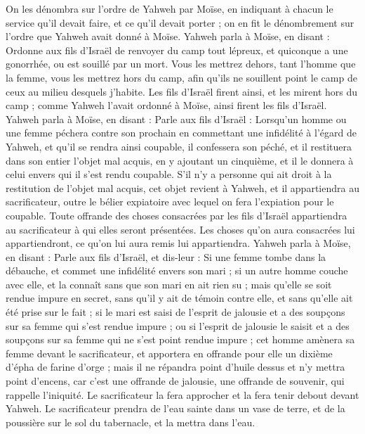 \begin{multicols}{2}
On les dénombra sur l’ordre de Yahweh par Moïse, en indiquant à chacun le service qu’il devait faire, et ce qu'il devait porter ; on en fit le dénombrement sur l’ordre que Yahweh avait donné à Moïse.
\VerseOne{}Yahweh parla à Moïse, en disant :
Ordonne aux fils d'Israël de renvoyer du camp tout lépreux, et quiconque a une gonorrhée, ou est souillé par un mort.
Vous les mettrez dehors, tant l'homme que la femme, vous les mettrez hors du camp, afin qu'ils ne souillent point le camp de ceux au milieu desquels j'habite.
Les fils d'Israël firent ainsi, et les mirent hors du camp ; comme Yahweh l’avait ordonné à Moïse, ainsi firent les fils d'Israël.
Yahweh parla à Moïse, en disant :
Parle aux fils d'Israël : Lorsqu’un homme ou une femme péchera contre son prochain en commettant une infidélité à l’égard de Yahweh, et qu’il se rendra ainsi coupable,
il confessera son péché, et il restituera dans son entier l’objet mal acquis, en y ajoutant un cinquième, et il le donnera à celui envers qui il s’est rendu coupable.
S’il n’y a personne qui ait droit à la restitution de l’objet mal acquis, cet objet revient à Yahweh, et il appartiendra au sacrificateur, outre le bélier expiatoire avec lequel on fera l’expiation pour le coupable.
Toute offrande des choses consacrées par les fils d'Israël appartiendra au sacrificateur à qui elles seront présentées.
Les choses qu’on aura consacrées lui appartiendront, ce qu’on lui aura remis lui appartiendra.
Yahweh parla à Moïse, en disant :
Parle aux fils d'Israël, et dis-leur : Si une femme tombe dans la débauche, et commet une infidélité envers son mari ;
si un autre homme couche avec elle, et la connaît sans que son mari en ait rien su ; mais qu'elle se soit rendue impure en secret, sans qu’il y ait de témoin contre elle, et sans qu’elle ait été prise sur le fait ;
si le mari est saisi de l'esprit de jalousie et a des soupçons sur sa femme qui s'est rendue impure ; ou si l'esprit de jalousie le saisit et a des soupçons sur sa femme qui ne s’est point rendue impure ;
cet homme amènera sa femme devant le sacrificateur, et apportera en offrande pour elle un dixième d'épha de farine d'orge ; mais il ne répandra point d'huile dessus et n'y mettra point d'encens, car c'est une offrande de jalousie, une offrande de souvenir, qui rappelle l'iniquité.
Le sacrificateur la fera approcher et la fera tenir debout devant Yahweh.
Le sacrificateur prendra de l'eau sainte dans un vase de terre, et de la poussière sur le sol du tabernacle, et la mettra dans l'eau.

\end{multicols}
